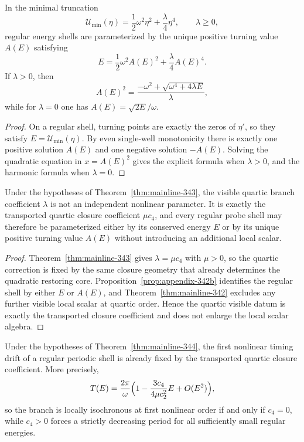 \begin{proposition}
\label{prop:appendix-342b}
In the minimal truncation
\[
  \mathcal U_{\min}(\eta)=\frac12\omega^2\eta^2+\frac{\lambda}{4}\eta^4,
  \qquad \lambda\ge 0,
\]
regular energy shells are parameterized by the unique positive turning value $A(E)$ satisfying
\[
  E=\frac12\omega^2A(E)^2+\frac{\lambda}{4}A(E)^4.
\]
If $\lambda>0$, then
\[
  A(E)^2=\frac{-\omega^2+\sqrt{\omega^4+4\lambda E}}{\lambda},
\]
while for $\lambda=0$ one has $A(E)=\sqrt{2E}/\omega$.
\end{proposition}

\begin{proof}
On a regular shell, turning points are exactly the zeros of $\eta'$, so they satisfy $E=\mathcal U_{\min}(\eta)$. By even single-well monotonicity there is exactly one positive solution $A(E)$ and one negative solution $-A(E)$. Solving the quadratic equation in $x=A(E)^2$ gives the explicit formula when $\lambda>0$, and the harmonic formula when $\lambda=0$.
\end{proof}

\begin{proposition}
\label{prop:app-c-34-4}
Under the hypotheses of Theorem~\ref{thm:mainline-343}, the visible quartic branch coefficient $\lambda$ is not an independent nonlinear parameter. It is exactly the transported quartic closure coefficient $\mu c_4$, and every regular probe shell may therefore be parameterized either by its conserved energy $E$ or by its unique positive turning value $A(E)$ without introducing an additional local scalar.
\end{proposition}

\begin{proof}
Theorem~\ref{thm:mainline-343} gives $\lambda=\mu c_4$ with $\mu>0$, so the quartic correction is fixed by the same closure geometry that already determines the quadratic restoring core. Proposition~\ref{prop:appendix-342b} identifies the regular shell by either $E$ or $A(E)$, and Theorem~\ref{thm:mainline-342} excludes any further visible local scalar at quartic order. Hence the quartic visible datum is exactly the transported closure coefficient and does not enlarge the local scalar algebra.
\end{proof}


\begin{proposition}
\label{prop:app-c-34-5}
Under the hypotheses of Theorem~\ref{thm:mainline-344}, the first nonlinear timing drift of a regular periodic shell is already fixed by the transported quartic closure coefficient. More precisely,
\[
  T(E)=\frac{2\pi}{\omega}\Bigl(1-\frac{3c_4}{4\mu c_2^2}E+O(E^2)\Bigr),
\]
so the branch is locally isochronous at first nonlinear order if and only if $c_4=0$, while $c_4>0$ forces a strictly decreasing period for all sufficiently small regular energies.
\end{proposition}


